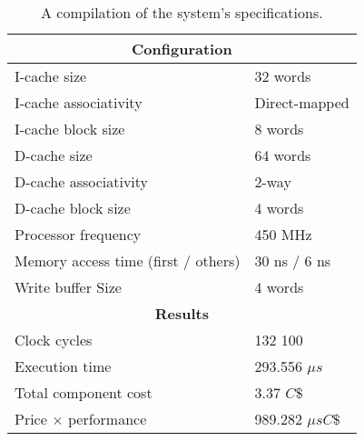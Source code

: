\documentclass[a4paper,9pt,fleqn]{article}
\begin{document}
\begin{table}
	\center
	\large
	\def\arraystretch{1.2} 
	\begin{tabular}{|l|l|}
		\hline
		\multicolumn{2}{|c|}{\bf Configuration} 						\\ \hline
		I-cache size						& 32 words 			\\ 
		I-cache associativity 				& Direct-mapped		\\ 
		I-cache block size		 			& 8 words				\\ \hline
		D-cache size 		 				& 64 words			\\ 
		D-cache associativity 				& 2-way				\\ 
		D-cache block size 		 			& 4 words				\\ \hline
		Processor frequency		 			& 450 MHz			\\ \hline
		Memory access time (first / others) 		& 30 ns / 6 ns			\\ 
		Write buffer Size 		 			& 4 words				\\ \hline
		\multicolumn{2}{|c|}{\bf Results} 							\\ \hline
		Clock cycles 						& 132 100 			\\ 
		Execution time		 				& 293.556 $ \mu s $ 		\\ 
		Total component cost 				& 3.37 $ C\$ $			\\ 
		Price $ \times $ performance			& 989.282 $ \mu sC\$ $	\\ \hline
	\end{tabular}
	\caption{A compilation of the system's specifications.}
	\label{specs}
\end{table}
\end{document}
